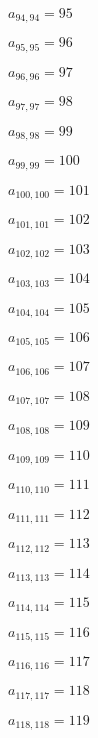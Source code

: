 \documentclass[a4paper,12pt]{article}
\begin{document}
$a _{ 94, 94 } = 95$

$a _{ 95, 95 } = 96$

$a _{ 96, 96 } = 97$

$a _{ 97, 97 } = 98$

$a _{ 98, 98 } = 99$

$a _{ 99, 99 } = 100$

$a _{ 100, 100 } = 101$

$a _{ 101, 101 } = 102$

$a _{ 102, 102 } = 103$

$a _{ 103, 103 } = 104$

$a _{ 104, 104 } = 105$

$a _{ 105, 105 } = 106$

$a _{ 106, 106 } = 107$

$a _{ 107, 107 } = 108$

$a _{ 108, 108 } = 109$

$a _{ 109, 109 } = 110$

$a _{ 110, 110 } = 111$

$a _{ 111, 111 } = 112$

$a _{ 112, 112 } = 113$

$a _{ 113, 113 } = 114$

$a _{ 114, 114 } = 115$

$a _{ 115, 115 } = 116$

$a _{ 116, 116 } = 117$

$a _{ 117, 117 } = 118$

$a _{ 118, 118 } = 119$
\end{document}

